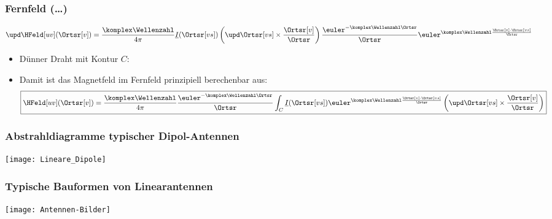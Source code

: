 \begin{frame}
  \frametitle{Fernfeld (\dots)}
            \begin{equation*}
          \upd\HFeld[uv](\Ortsr[v]) = \frac{\komplex\Wellenzahl}{4\pi} \underline{I}(\Ortsr[vs]) \left( \upd\Ortsr[vs] \times \frac{\Ortsr[v]}{\Ortsr} \right) \frac{\euler^{-\komplex\Wellenzahl \Ortsr}}{\Ortsr} \euler^{\komplex\Wellenzahl \frac{\Ortsr[v]\cdot \Ortsr[vs]}{\Ortsr}}
          \end{equation*}
  \begin{itemize}[<+->]
  \item Dünner Draht mit Kontur \(C\):
    \bigskip
    
\item Damit ist das Magnetfeld im Fernfeld prinzipiell berechenbar aus:
            \begin{equation*}
          \boxed{\HFeld[uv](\Ortsr[v]) = \frac{\komplex\Wellenzahl}{4\pi} \frac{\euler^{-\komplex\Wellenzahl \Ortsr}}{\Ortsr} \int_{C}\underline{I}(\Ortsr[vs]) \euler^{\komplex\Wellenzahl \frac{\Ortsr[v]\cdot \Ortsr[vs]}{\Ortsr}} \left( \upd\Ortsr[vs] \times \frac{\Ortsr[v]}{\Ortsr} \right)} 
          \end{equation*}
  \end{itemize}
  \end{frame}

  \begin{frame}
  \frametitle{Abstrahldiagramme typischer Dipol-Antennen}
\centerline{\texttt{[image: Lineare\_Dipole]}}
  \end{frame}

    \begin{frame}
  \frametitle{Typische Bauformen von Linearantennen}
\centerline{\texttt{[image: Antennen-Bilder]}}
  \end{frame}


   
